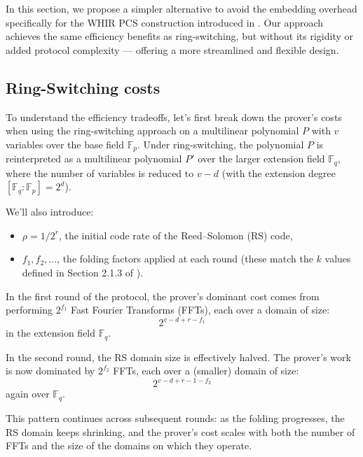 \documentclass{article}
\newcommand{\Fp}{\mathbb F_p}
\newcommand{\Fq}{\mathbb F_q}
\begin{document}
In this section, we propose a simpler alternative to avoid the embedding overhead specifically for the WHIR PCS construction introduced in \cite{whir}. Our approach achieves the same efficiency benefits as ring-switching, but without its rigidity or added protocol complexity — offering a more streamlined and flexible design.


\subsection{Ring-Switching costs}



To understand the efficiency tradeoffs, let’s first break down the prover’s costs when using the ring-switching approach on a multilinear polynomial $P$ with $v$ variables over the base field $\Fp$. Under ring-switching, the polynomial $P$ is reinterpreted as a multilinear polynomial $P'$ over the larger extension field $\Fq$, where the number of variables is reduced to $v - d$ (with the extension degree $[\Fq:\Fp] = 2^d$).


We’ll also introduce:
\begin{itemize}
    \item $\rho = 1 / 2^r$, the initial code rate of the Reed–Solomon (RS) code,
    \item $f_1, f_2, \dots$, the folding factors applied at each round (these match the $k$ values defined in Section 2.1.3 of \cite{whir}).
\end{itemize}



In the first round of the protocol, the prover’s dominant cost comes from performing $2^{f_1}$ Fast Fourier Transforms (FFTs), each over a domain of size:
$$
2^{v - d + r - f_1}
$$
in the extension field $\Fq$.

In the second round, the RS domain size is effectively halved. The prover’s work is now dominated by $2^{f_2}$ FFTs, each over a (smaller) domain of size:
$$
2^{v - d + r - 1 - f_2}
$$
again over $\Fq$. 


This pattern continues across subsequent rounds: as the folding progresses, the RS domain keeps shrinking, and the prover’s cost scales with both the number of FFTs and the size of the domains on which they operate.
\end{document}
